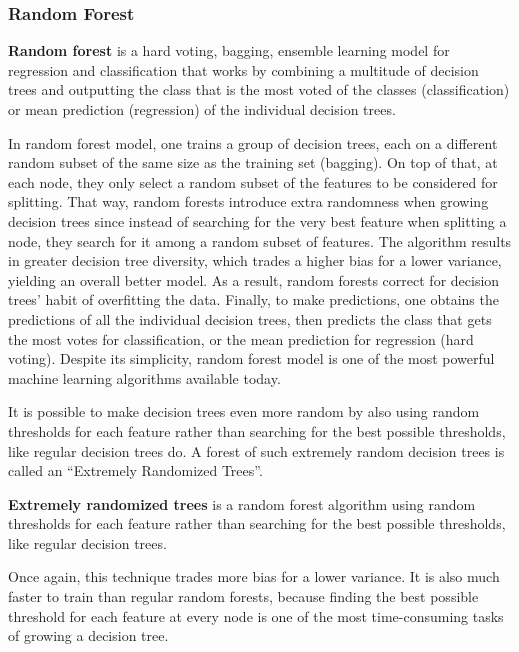 \subsubsection{Random Forest}

\textbf{Random forest} is a hard voting, bagging, ensemble learning model for regression and classification that works
by combining a multitude of decision trees and outputting the class that is the most voted of the classes
(classification) or mean prediction (regression) of the individual decision trees.
\ed

In random forest model, one trains a group of decision trees, each on a different random subset of the same size as
the training set (bagging). On top of that, at each node, they only select a random subset of the features to be
considered for splitting. That way, random forests introduce extra randomness when growing decision trees since
instead of searching for the very best feature when splitting a node, they search for it among a random subset of
features. The algorithm results in greater decision tree diversity, which trades a higher bias for a lower variance,
yielding an overall better model. As a result, random forests correct for decision trees' habit of overfitting the data.
Finally, to make predictions, one obtains the predictions of all the individual decision trees, then predicts the
class that gets the most votes for classification, or the mean prediction for regression (hard voting). Despite its
simplicity, random forest model is one of the most powerful machine learning algorithms available today.


It is possible to make decision trees even more random by also using random thresholds for each feature rather than
searching for the best possible thresholds, like regular decision trees do. A forest of such extremely random
decision trees is called an ``Extremely Randomized Trees''.

\textbf{Extremely randomized trees} is a random forest algorithm using random thresholds for each feature rather than
searching for the best possible thresholds, like regular decision trees.
\ed

Once again, this technique trades more bias for a lower variance. It is also much faster to train than regular
random forests, because finding the best possible threshold for each feature at every node is one of the most
time-consuming tasks of growing a decision tree.

